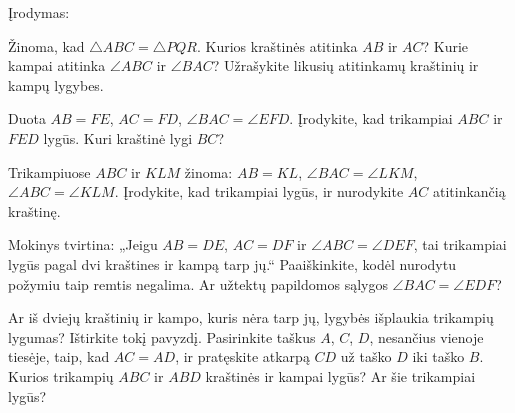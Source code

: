 \documentclass[12pt,a4paper,reqno]{amsart}
\newcommand{\krastineszymek}[1]{\tikz[baseline=(current bounding box.center)]{\foreach \x in {#1}{\draw (\x pt,-2.5pt)--(\x pt,2.5pt);}}}
\theoremstyle{plain}\newtheorem{theorem}{Teorema}[section]
\theoremstyle{definition}
\theoremstyle{remark}\newtheorem{remark}[theorem]{Pastaba}\newtheorem*{remark*}{Pastaba}
\theoremstyle{definition}\newtheorem*{problem*}{Uždavinys}
\begin{document}
Įrodymas:\par
\rule{0pt}{1.2em}\dotfill\par
\rule{0pt}{1.2em}\dotfill\par
\rule{0pt}{1.2em}\dotfill\par
\rule{0pt}{1.2em}\dotfill\par
\rule{0pt}{1.2em}\dotfill\par


\begin{problem}\label{uzd:lygybe-atitikimas-01} Žinoma, kad $\triangle ABC=\triangle PQR$. Kurios kraštinės atitinka $AB$ ir $AC$? Kurie kampai atitinka $\angle ABC$ ir $\angle BAC$? Užrašykite likusių atitinkamų kraštinių ir kampų lygybes. \end{problem}
\begin{problem}\label{uzd:lygybe-sas-01} Duota $AB=FE$, $AC=FD$, $\angle BAC=\angle EFD$. Įrodykite, kad trikampiai $ABC$ ir $FED$ lygūs. Kuri kraštinė lygi $BC$? \end{problem}
\begin{problem}\label{uzd:lygybe-asa-01} Trikampiuose $ABC$ ir $KLM$ žinoma: $AB=KL$, $\angle BAC=\angle LKM$, $\angle ABC=\angle KLM$. Įrodykite, kad trikampiai lygūs, ir nurodykite $AC$ atitinkančią kraštinę. \end{problem}
\begin{problem}\label{uzd:lygybe-klaida-01} Mokinys tvirtina: „Jeigu $AB=DE$, $AC=DF$ ir $\angle ABC=\angle DEF$, tai trikampiai lygūs pagal dvi kraštines ir kampą tarp jų.“ Paaiškinkite, kodėl nurodytu požymiu taip remtis negalima. Ar užtektų papildomos sąlygos $\angle BAC=\angle EDF$? \end{problem}
\begin{problem}\label{uzd:lygybe-ssa-01} Ar iš dviejų kraštinių ir kampo, kuris nėra tarp jų, lygybės išplaukia trikampių lygumas? Ištirkite tokį pavyzdį. Pasirinkite taškus $A$, $C$, $D$, nesančius vienoje tiesėje, taip, kad $AC=AD$, ir pratęskite atkarpą $CD$ už taško $D$ iki taško $B$. Kurios trikampių $ABC$ ir $ABD$ kraštinės ir kampai lygūs? Ar šie trikampiai lygūs? \end{problem}
\begin{center}
\end{center}
\end{document}
